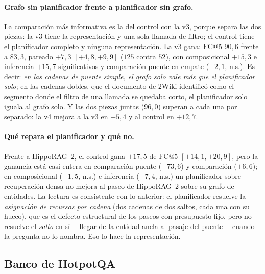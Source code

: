 \documentclass[11pt,a4paper]{article}
\newcommand{\hippo}{HippoRAG~2}
\begin{document}
\paragraph{Grafo sin planificador frente a planificador sin grafo.}
La comparación más informativa es la del control con la v3, porque separa
las dos piezas: la v3 tiene la representación y una sola llamada de
filtro; el control tiene el planificador completo y ninguna
representación. La v3 gana: $\mathrm{FC@}5$ $90{,}6$ frente a $83{,}3$,
pareado $+7{,}3$ $[+4{,}8,+9{,}9]$ ($125$ contra $52$), con composicional
$+15{,}3$ e inferencia $+15{,}7$ significativos y comparación-puente en
empate ($-2{,}1$, n.s.). Es decir: \emph{en las cadenas de puente simple,
el grafo solo vale más que el planificador solo}; en las cadenas dobles,
que el documento de 2Wiki identificó como el segmento donde el filtro de
una llamada se quedaba corto, el planificador solo iguala al grafo solo. Y
las dos piezas juntas ($96{,}0$) superan a cada una por separado: la v4
mejora a la v3 en $+5{,}4$ y al control en $+12{,}7$.

\paragraph{Qué repara el planificador y qué no.}
Frente a \hippo{}, el control gana $+17{,}5$ de $\mathrm{FC@}5$
$[+14{,}1,+20{,}9]$, pero la ganancia está casi entera en comparación-puente
($+73{,}6$) y comparación ($+6{,}6$); en composicional ($-1{,}5$, n.s.) e
inferencia ($-7{,}4$, n.s.) un planificador sobre recuperación densa no
mejora al paseo de \hippo{} sobre su grafo de entidades. La lectura es
consistente con lo anterior: el planificador resuelve la \emph{asignación
de recursos por cadena} (dos cadenas de dos saltos, cada una con su hueco),
que es el defecto estructural de los paseos con presupuesto fijo, pero no
resuelve el \emph{salto} en sí ---llegar de la entidad ancla al pasaje del
puente--- cuando la pregunta no lo nombra. Eso lo hace la representación.

\subsection{Banco de HotpotQA}
\label{sec:bancohotpot}
\end{document}
